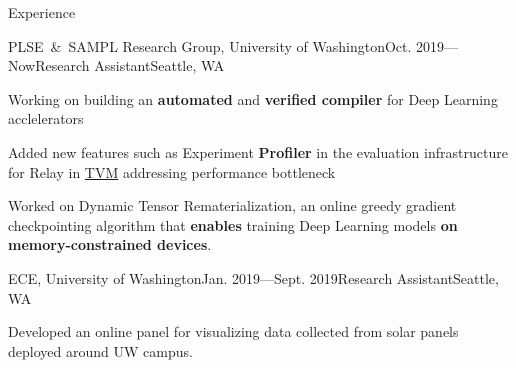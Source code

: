 \documentclass{resume}
\begin{document}

	\begin{rSection}{Experience}



		\begin{rSubsection}{PLSE\ \&\ SAMPL Research Group, University of Washington}{Oct. 2019---Now}{Research Assistant}{Seattle, WA} 
			\item Working on building an \textbf{automated} and \textbf{verified compiler} for Deep Learning acclelerators
			\item Added new features such as Experiment \textbf{Profiler} in the evaluation infrastructure for Relay in \href{https://tvm.ai}{TVM} addressing performance bottleneck
			\item Worked on Dynamic Tensor Rematerialization, an online greedy gradient checkpointing algorithm that \textbf{enables} training Deep Learning models \textbf{on memory-constrained devices}.
		\end{rSubsection}
		\vspace{-5pt}


		\begin{rSubsection}{ECE, University of Washington}{Jan. 2019---Sept. 2019}{Research Assistant}{Seattle, WA}
			\item Developed an online panel for visualizing data collected from solar panels deployed around UW campus.
		\end{rSubsection}
		\vspace{-5pt}


	\end{rSection}
	\vspace{-5pt}
\end{document}
